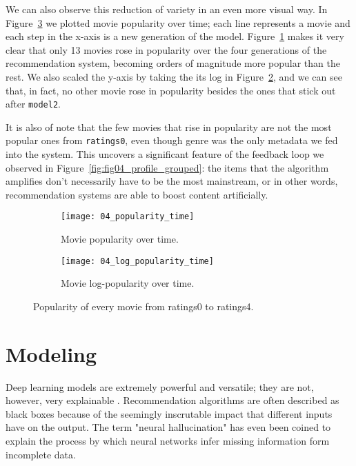 We can also observe this reduction of variety in an even more visual way. In
Figure~\ref{fig:fig04_popularity_time_both} we plotted movie popularity over
time; each line represents a movie and each step in the x-axis is a new
generation of the model. Figure~\ref{fig:fig04_popularity_time} makes it very
clear that only 13 movies rose in popularity over the four generations of the
recommendation system, becoming orders of magnitude more popular than the rest.
We also scaled the y-axis by taking the its log in
Figure~\ref{fig:fig04_log_popularity_time}, and we can see that, in fact, no
other movie rose in popularity besides the ones that stick out after
\verb|model2|.

It is also of note that the few movies that rise in popularity are not the most
popular ones from \verb|ratings0|, even though genre was the only metadata we
fed into the system. This uncovers a significant feature of the feedback loop we
observed in Figure~\ref{fig:fig04_profile_grouped}: the items that the algorithm
amplifies don't necessarily have to be the most mainstream, or in other words,
recommendation systems are able to boost content artificially.

\begin{figure}
  \centering
  \begin{subfigure}{0.45\textwidth}
    \centering
    \texttt{[image: 04\_popularity\_time]}
    \caption{Movie popularity over time.\label{fig:fig04_popularity_time}}
  \end{subfigure}
  \begin{subfigure}{0.45\textwidth}
    \centering
    \texttt{[image: 04\_log\_popularity\_time]}
    \caption{Movie log-popularity over time.\label{fig:fig04_log_popularity_time}}
  \end{subfigure}
  \caption{Popularity of every movie from ratings0 to ratings4.\label{fig:fig04_popularity_time_both}}
\end{figure}

\section{Modeling}
\label{sec:modeling04}

Deep learning models are extremely powerful and versatile; they are not,
however, very explainable \citep{roscher_explainable_2020}. Recommendation
algorithms are often described as black boxes because of the seemingly
inscrutable impact that different inputs have on the output. The term "neural
hallucination" \citep{raunak_curious_2021} has even been coined to explain the
process by which neural networks infer missing information form incomplete data.

